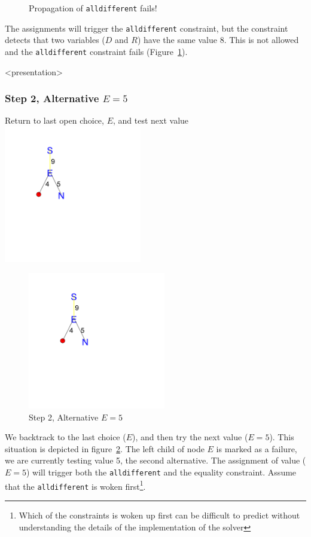 \begin{figure}[ht]
\caption{\label{sendmore:alldifferentprop2}Propagation of \texttt{alldifferent} fails!}
\begin{center}

\end{center}
\end{figure}


The assignments will trigger the \texttt{alldifferent} constraint, but the constraint detects that two variables ($D$ and $R$) have the same value 8. This is not allowed and the \texttt{alldifferent} constraint fails (Figure~\ref{sendmore:alldifferentprop2}).

\begin{frame}<presentation>
\frametitle{Step 2, Alternative $E = 5$}
Return to last open choice, $E$, and test next value
\includegraphics[width=6cm]{../sendmore/FULL/tree_expanded_4}
\end{frame}

\begin{figure}[ht]
\caption{\label{sendmore:Step 2, Alternative 2}Step 2, Alternative $E = 5$}
\begin{center}
\includegraphics[width=6cm]{../sendmore/FULL/tree_expanded_4}
\end{center}
\end{figure}

We backtrack to the last choice ($E$), and then try the next value ($E = 5$). This situation is depicted in figure~\ref{sendmore:Step 2, Alternative 2}. The left child of node $E$ is marked as a failure, we are currently testing value 5, the second alternative.
The assignment of value ($E=5$) will trigger both the \texttt{alldifferent} and the equality constraint. Assume that the \texttt{alldifferent} is woken first\footnote{Which of the constraints is woken up first can be difficult to predict without understanding the details of the implementation of the solver}.

